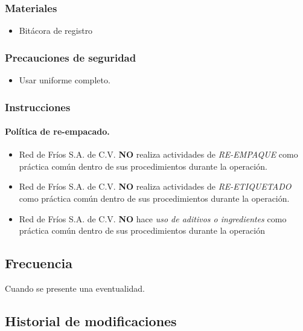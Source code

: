 \subsubsection{Materiales}

\begin{itemize}
	\item Bitácora de registro
\end{itemize}

\subsubsection{Precauciones de seguridad}

\begin{itemize}
	\item Usar uniforme completo.
\end{itemize}

\subsubsection{Instrucciones}

\paragraph{Política de re-empacado.}

\begin{itemize}
	\item Red de Fríos S.A. de C.V. \textbf{NO} realiza actividades de \emph{RE-EMPAQUE} como práctica común dentro de sus procedimientos durante la operación.
	\item Red de Fríos S.A. de C.V. \textbf{NO} realiza actividades de \emph{RE-ETIQUETADO} como práctica común dentro de sus procedimientos durante la operación.
	\item Red de Fríos S.A. de C.V. \textbf{NO} hace \emph{uso de aditivos o ingredientes} como práctica común dentro de sus procedimientos durante la operación
\end{itemize}

\subsection{Frecuencia}

Cuando se presente una eventualidad.

\subsection{Historial de modificaciones}

